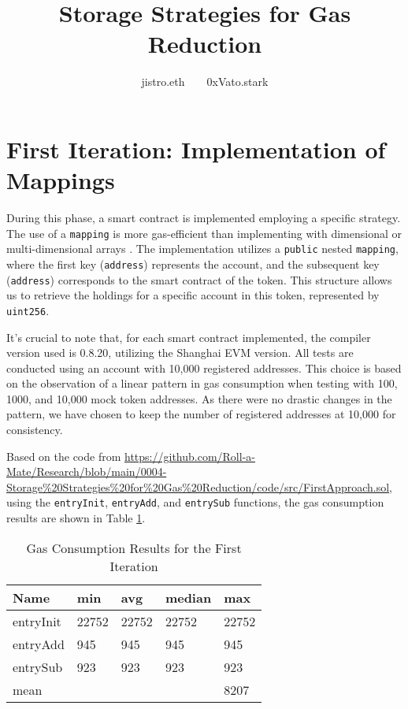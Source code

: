 \documentclass[fleqn,10pt]{olplainarticle}
\title{Storage Strategies for Gas Reduction}
\author[1]{jistro.eth~~~~0xVato.stark}
\begin{document}
\flushbottom
\maketitle
\thispagestyle{empty}

\tableofcontents

\section{First Iteration: Implementation of Mappings}
During this phase, a smart contract is implemented employing a specific strategy. The use of a \texttt{mapping} is more gas-efficient than implementing with dimensional or multi-dimensional arrays \cite{natewelch__answer_2018}. The implementation utilizes a \texttt{public} nested \texttt{mapping}, where the first key (\texttt{address}) represents the account, and the subsequent key (\texttt{address}) corresponds to the smart contract of the token. This structure allows us to retrieve the holdings for a specific account in this token, represented by \texttt{uint256}.
\begin{myquote}[colback=gray!30, size=small]
It's crucial to note that, for each smart contract implemented, the compiler version used is 0.8.20, utilizing the Shanghai EVM version. All tests are conducted using an account with 10,000 registered addresses. This choice is based on the observation of a linear pattern in gas consumption when testing with 100, 1000, and 10,000 mock token addresses. As there were no drastic changes in the pattern, we have chosen to keep the number of registered addresses at 10,000 for consistency.
\end{myquote}
Based on the code from \url{https://github.com/Roll-a-Mate/Research/blob/main/0004-Storage%20Strategies%20for%20Gas%20Reduction/code/src/FirstApproach.sol}, using the \texttt{entryInit}, \texttt{entryAdd}, and \texttt{entrySub} functions, the gas consumption results are shown in Table \ref{tab:FirstIT}.

\begin{table}[H]
	\centering
	\begin{tabular}{|l|l|l|l|l|}
		\hline
		Name       & min    & avg   & median &  max   \\ \hline
		entryInit  & 22752  & 22752 & 22752  &  22752 \\ \hline
		entryAdd   & 945  	& 945 	& 945  	 &  945   \\ \hline
		entrySub   & 923  	& 923 	& 923    &  923   \\ \hline
		mean       &\cellcolor{black}&\cellcolor{black}&\cellcolor{black}&8207\\ \hline
	\end{tabular}
	\caption{Gas Consumption Results for the First Iteration}
	\label{tab:FirstIT}
\end{table}
\end{document}
